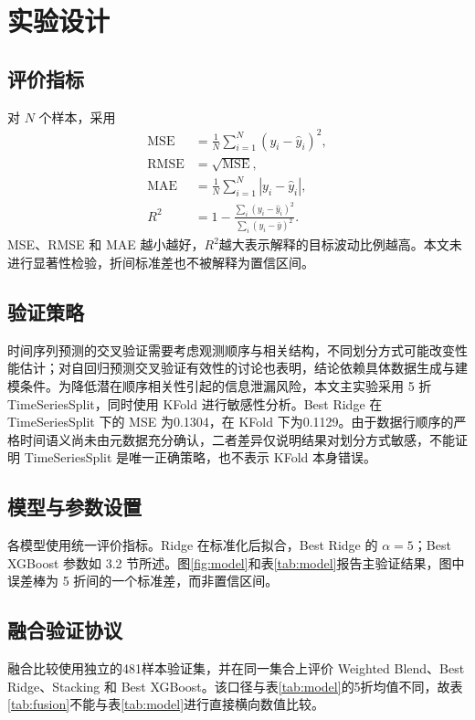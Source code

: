 \documentclass[UTF8,a4paper,twocolumn,zihao=5,fontset=none]{ctexart}
\newcommand{\Rtwo}{\ensuremath{R^{2}}}
\begin{document}
\section{实验设计}
\subsection{评价指标}
对 $N$ 个样本，采用
\begin{align}
 \mathrm{MSE}&=\frac{1}{N}\sum_{i=1}^{N}(y_i-\hat y_i)^2,\\
 \mathrm{RMSE}&=\sqrt{\mathrm{MSE}},\\
 \mathrm{MAE}&=\frac{1}{N}\sum_{i=1}^{N}|y_i-\hat y_i|,\\
 R^2&=1-\frac{\sum_i(y_i-\hat y_i)^2}{\sum_i(y_i-\bar y)^2}.
\end{align}
MSE、RMSE 和 MAE 越小越好，\Rtwo 越大表示解释的目标波动比例越高。本文未进行显著性检验，折间标准差也不被解释为置信区间。

\subsection{验证策略}
时间序列预测的交叉验证需要考虑观测顺序与相关结构，不同划分方式可能改变性能估计\citep{bergmeir2012cv}；对自回归预测交叉验证有效性的讨论也表明，结论依赖具体数据生成与建模条件\citep{bergmeir2018cv}。为降低潜在顺序相关性引起的信息泄漏风险，本文主实验采用 5 折 TimeSeriesSplit，同时使用 KFold 进行敏感性分析。Best Ridge 在 TimeSeriesSplit 下的 MSE 为0.1304，在 KFold 下为0.1129。由于数据行顺序的严格时间语义尚未由元数据充分确认，二者差异仅说明结果对划分方式敏感，不能证明 TimeSeriesSplit 是唯一正确策略，也不表示 KFold 本身错误。

\subsection{模型与参数设置}
各模型使用统一评价指标。Ridge 在标准化后拟合，Best Ridge 的 $\alpha = 5$；Best XGBoost 参数如 3.2 节所述。图\ref{fig:model}和表\ref{tab:model}报告主验证结果，图中误差棒为 5 折间的一个标准差，而非置信区间。

\subsection{融合验证协议}
融合比较使用独立的481样本验证集，并在同一集合上评价 Weighted Blend、Best Ridge、Stacking 和 Best XGBoost。该口径与表\ref{tab:model}的5折均值不同，故表\ref{tab:fusion}不能与表\ref{tab:model}进行直接横向数值比较。
\end{document}

